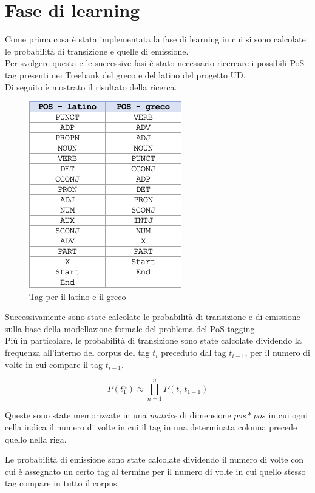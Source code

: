 \documentclass[12pt]{article}
\begin{document}
\section{Fase di learning}
Come prima cosa è stata implementata la fase di learning in cui si sono calcolate le probabilità di transizione e quelle di emissione.
\\Per svolgere questa e le successive fasi è stato necessario ricercare i possibili PoS tag presenti nei Treebank del greco e del latino del progetto UD. 
\\Di seguito è mostrato il risultato della ricerca.

\begin{figure}[!h]
   \centering
   \includegraphics[scale=0.5]{fig/POSLatinoGreco.png}
   \caption{Tag per il latino e il greco}\label{fig:pos}
\end{figure}

Successivamente sono state calcolate le probabilità di transizione e di emissione sulla base della modellazione formale del problema del PoS tagging.
\\Più in particolare, le probabilità di transizione sono state calcolate dividendo la frequenza all’interno del corpus del tag $t_i$ preceduto dal tag $t_{i-1}$, per il numero di volte in cui compare il tag $t_{i-1}$.

\[ P(t_1^n) \approx \prod_{n=1}^n P(t_i|t_{1-1})\]


Queste sono state memorizzate in una \textit{matrice} di dimensione $pos * pos$ in cui ogni cella indica il numero di volte in cui il tag in una determinata colonna precede quello nella riga.

Le probabilità di emissione sono state calcolate dividendo il numero di volte con cui è assegnato un certo tag al termine per il numero di volte in cui quello stesso tag compare in tutto il corpus.
\end{document}
